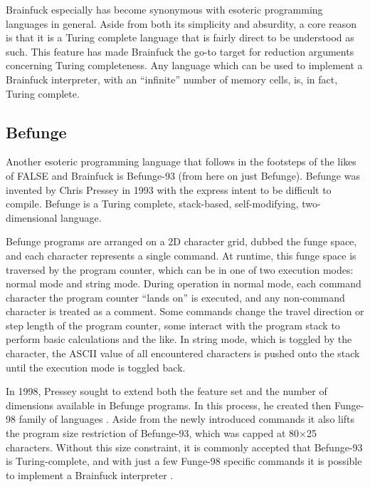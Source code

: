 \documentclass[sigconf,nonacm,screen,review,balance=false]{acmart}
\begin{document}
Brainfuck especially has become synonymous with esoteric programming languages
in general. Aside from both its simplicity and absurdity, a core reason is
that it is a Turing complete language \cite{bfTuringComplete} that is fairly
direct to be understood as such. This feature has made Brainfuck the go-to
target for reduction arguments concerning Turing completeness. Any language
which can be used to implement a Brainfuck interpreter, with an ``infinite''
number of memory cells\footnotemark, is, in fact, Turing complete.


\subsection{Befunge}
\label{sec:befunge}

Another esoteric programming language that follows in the footsteps of the likes
of FALSE and Brainfuck is Befunge-93 \cite{befunge} (from here on just
Befunge). Befunge was invented by Chris Pressey in 1993 with the express intent
to be difficult to compile. Befunge is a Turing complete, stack-based,
self-modifying, two-dimensional language.

Befunge programs are arranged on a 2D character grid, dubbed the funge space,
and each character represents a single command. At runtime, this funge space is
traversed by the program counter, which can be in one of two execution modes:
normal mode and string mode. During operation in normal mode, each command
character the program counter ``lands on'' is executed, and any non-command
character is treated as a comment. Some commands change the travel direction or
step length of the program counter, some interact with the program stack to
perform basic calculations and the like. In string mode, which is toggled by
the  character, the ASCII value of all encountered characters is
pushed onto the stack until the execution mode is toggled back.

In 1998, Pressey sought to extend both the feature set and the number of
dimensions available in Befunge programs. In this process, he created then
Funge-98 family of languages \cite{befunge98}. Aside from the newly introduced
commands it also lifts the program size restriction of Befunge-93, which was
capped at 80$\times$25 characters. Without this size constraint, it is commonly
accepted that Befunge-93 is Turing-complete, and with just a few Funge-98
specific commands it is possible to implement a Brainfuck interpreter
\cite{bfInBefunge}.
\end{document}
